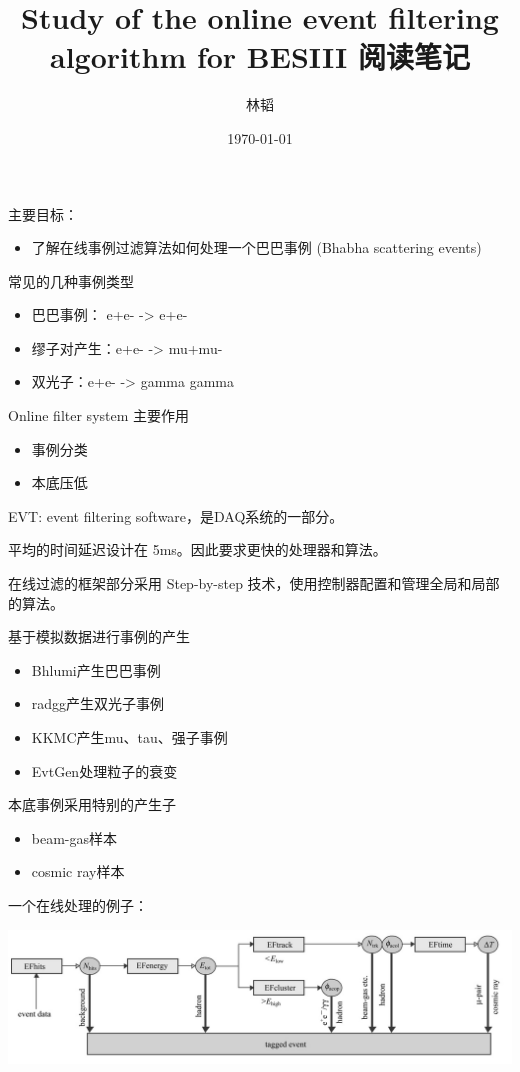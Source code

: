 \documentclass[11pt]{article}
\author{林韬}
\date{\today}
\title{Study of the online event filtering algorithm for BESIII 阅读笔记}
\begin{document}
\maketitle
\tableofcontents

主要目标：
\begin{itemize}
\item 了解在线事例过滤算法如何处理一个巴巴事例 (Bhabha scattering events)
\end{itemize}

常见的几种事例类型
\begin{itemize}
\item 巴巴事例： e+e- -> e+e-
\item 缪子对产生：e+e- -> mu+mu-
\item 双光子：e+e- -> gamma gamma
\end{itemize}

Online filter system 主要作用
\begin{itemize}
\item 事例分类
\item 本底压低
\end{itemize}

EVT: event filtering software，是DAQ系统的一部分。

平均的时间延迟设计在 5ms。因此要求更快的处理器和算法。

在线过滤的框架部分采用 Step-by-step 技术，使用控制器配置和管理全局和局部的算法。

基于模拟数据进行事例的产生
\begin{itemize}
\item Bhlumi产生巴巴事例
\item radgg产生双光子事例
\item KKMC产生mu、tau、强子事例
\item EvtGen处理粒子的衰变
\end{itemize}

本底事例采用特别的产生子
\begin{itemize}
\item beam-gas样本
\item cosmic ray样本
\end{itemize}

一个在线处理的例子：

\begin{center}
\includegraphics[width=.9\linewidth]{./figures/BESIIIFilterExample.png}
\end{center}
\end{document}
